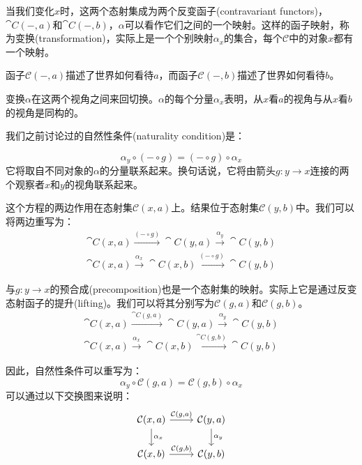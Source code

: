 \documentclass[DaoFP]{subfiles}
\begin{document}
    当我们变化$x$时，这两个态射集成为两个反变函子(contravariant functors)，$\cat C(-, a)$和$\cat C(-, b)$，$\alpha$可以看作它们之间的一个映射。这样的函子映射，称为变换(transformation)，实际上是一个个别映射$\alpha_x$的集合，每个$\mathcal{C}$中的对象$x$都有一个映射。

    函子$\mathcal{C}(-, a)$描述了世界如何看待$a$，而函子$\mathcal{C}(-, b)$描述了世界如何看待$b$。

    变换$\alpha$在这两个视角之间来回切换。$\alpha$的每个分量$\alpha_x$表明，从$x$看$a$的视角与从$x$看$b$的视角是同构的。

    我们之前讨论过的自然性条件(naturality condition)是：

    \[ \alpha_y \circ (- \circ g) = (- \circ g) \circ \alpha_x \]
    它将取自不同对象的$\alpha$的分量联系起来。换句话说，它将由箭头$g \colon y \to x$连接的两个观察者$x$和$y$的视角联系起来。

    这个方程的两边作用在态射集$\mathcal{C}(x, a)$上。结果位于态射集$\mathcal{C}(y, b)$中。我们可以将两边重写为：
    \begin{align*}
        \cat C(x, a) \xrightarrow{(- \circ g)} \cat C(y, a) \xrightarrow{\alpha_y} \cat C(y, b) \\
        \cat C(x, a) \xrightarrow{\alpha_x}  \cat C(x, b)  \xrightarrow{(- \circ g)}\cat C(y, b)
    \end{align*}

    与$g \colon y \to x$的预合成(precomposition)也是一个态射集的映射。实际上它是通过反变态射函子的提升(lifting)。我们可以将其分别写为$\mathcal{C}(g, a)$和$\mathcal{C}(g, b)$。
    \begin{align*}
        \cat C(x, a) \xrightarrow{\cat C(g, a)} \cat C(y, a) \xrightarrow{\alpha_y} \cat C(y, b) \\
        \cat C(x, a) \xrightarrow{\alpha_x}  \cat C(x, b)  \xrightarrow{\cat C(g, b)}\cat C(y, b)
    \end{align*}

    因此，自然性条件可以重写为：
    \[ \alpha_y \circ \mathcal{C}(g, a) = \mathcal{C}(g, b) \circ \alpha_x \]
    可以通过以下交换图来说明：
    \[
        \begin{tikzcd}
            \mathcal{C}(x, a)
            \arrow[d, "\alpha_x"]
            \arrow[r, "{\mathcal{C}(g, a)}"]
            &
            \mathcal{C}(y, a)
            \arrow[d, "\alpha_y"]
            \\
            \mathcal{C}(x, b)
            \arrow[r, "{\mathcal{C}(g, b)}"]
            & \mathcal{C}(y, b)
        \end{tikzcd}
    \]
\end{document}

